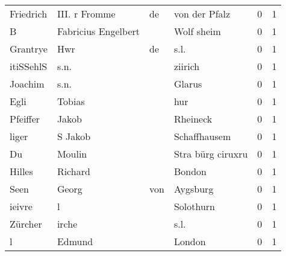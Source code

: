 \begin{tabular}{llllrr}
                Friedrich &                      III. r Fromme &          de &                               von der Pfalz &          0 &         1 \\
                        B &                Fabricius Engelbert &             &                                  Wolf sheim &          0 &         1 \\
                 Grantrye &                                Hwr &          de &                                        s.l. &          0 &         1 \\
                itiSSehlS &                               s.n. &             &                                     ziirich &          0 &         1 \\
                  Joachim &                               s.n. &             &                                      Glarus &          0 &         1 \\
                     Egli &                             Tobias &             &                                         hur &          0 &         1 \\
                 Pfeiffer &                              Jakob &             &                                    Rheineck &          0 &         1 \\
                    liger &                            S Jakob &             &                                Schaffhausem &          0 &         1 \\
                       Du &                             Moulin &             &                           Stra bürg ciruxru &          0 &         1 \\
                   Hilles &                            Richard &             &                                      Bondon &          0 &         1 \\
                     Seen &                              Georg &         von &                                    Aygsburg &          0 &         1 \\
                   ieivre &                                  l &             &                                   Solothurn &          0 &         1 \\
                  Zürcher &                              irche &             &                                        s.l. &          0 &         1 \\
                        l &                             Edmund &             &                                      London &          0 &         1 \\

\end{tabular}
